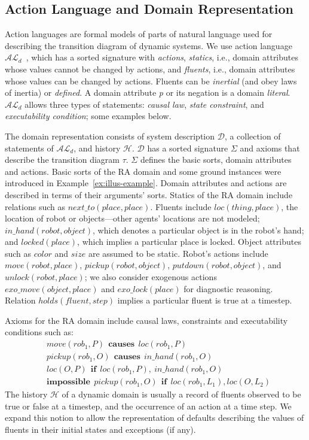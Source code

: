 \documentclass[letterpaper, 10 pt, conference]{article}  %
\begin{document}
\subsection{Action Language and Domain Representation}
\label{sec:arch-ald}
Action languages are formal models of parts of natural language used
for describing the transition diagram of dynamic systems. We use
action language $\mathcal{AL}_d$~\cite{gelfond:ANCL13}, which has a
sorted signature with \emph{actions}, \emph{statics}, i.e., domain
attributes whose values cannot be changed by actions, and
\emph{fluents}, i.e., domain attributes whose values can be changed by
actions. Fluents can be \emph{inertial} (and obey laws of inertia) or
\emph{defined}.  A domain attribute \emph{p} or its negation is a
domain \emph{literal}.  $\mathcal{AL}_d$ allows three types of
statements: \emph{causal law}, \emph{state constraint}, and
\emph{executability condition}; some examples below.

The domain representation consists of system description
$\mathcal{D}$, a collection of statements of $\mathcal{AL}_d$, and
history $\mathcal{H}$. $\mathcal{D}$ has a sorted signature $\Sigma$
and axioms that describe the transition diagram $\tau$. $\Sigma$
defines the basic sorts, domain attributes and actions. Basic sorts of
the RA domain and some ground instances were introduced in
Example~\ref{ex:illus-example}. Domain attributes and actions are
described in terms of their arguments' sorts. Statics of the RA domain
include relations such as $next\_to(place, place)$. Fluents include
$loc(thing, place)$, the location of robot or objects---other agents'
locations are not modeled; $in\_hand(robot, object)$, which denotes a
particular object is in the robot's hand; and $locked(place)$, which
implies a particular place is locked.  Object attributes such as
$color$ and $size$ are assumed to be static.  Robot's actions include
$move(robot, place)$, $pickup(robot, object)$, $putdown(robot,
object)$, and $unlock(robot, place)$; we also consider exogenous
actions $exo\_move(object, place)$ and $exo\_lock(place)$ for
diagnostic reasoning. Relation $holds(fluent, step)$ implies a
particular fluent is true at a timestep.

Axioms for the RA domain include causal laws, constraints and
executability conditions such as:
\begin{align*}
  &move(rob_1, P)~~\mathbf{causes}~~loc(rob_1, P) \\
  &pickup(rob_1, O)~~\mathbf{causes}~~in\_hand(rob_1, O) \\
  &loc(O, P)~~\mathbf{if}~~ loc(rob_1, P),~in\_hand(rob_1, O)\\
  &\mathbf{impossible}~~pickup(rob_1, O)~~\mathbf{if}~~loc(rob_1,
  L_1), loc(O, L_2)
\end{align*}
The history $\mathcal{H}$ of a dynamic domain is usually a record of
fluents observed to be true or false at a timestep, and the occurrence
of an action at a time step. We expand this notion to allow the
representation of defaults describing the values of fluents in their
initial states and exceptions (if any).
\end{document}
